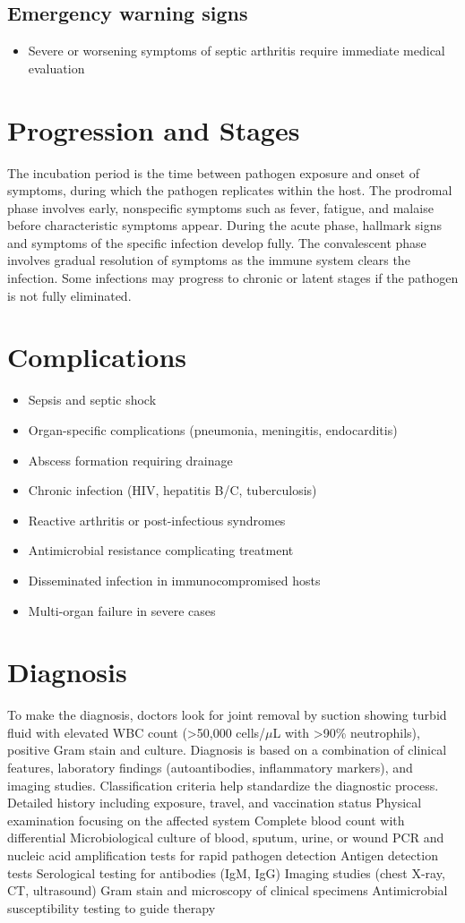 \subsection{Emergency warning signs}
\begin{itemize}[noitemsep]
  \item Severe or worsening symptoms of septic arthritis require immediate medical evaluation
\end{itemize}
\section{Progression and Stages}
The incubation period is the time between pathogen exposure and onset of symptoms, during which the pathogen replicates within the host. The prodromal phase involves early, nonspecific symptoms such as fever, fatigue, and malaise before characteristic symptoms appear. During the acute phase, hallmark signs and symptoms of the specific infection develop fully. The convalescent phase involves gradual resolution of symptoms as the immune system clears the infection. Some infections may progress to chronic or latent stages if the pathogen is not fully eliminated.
\section{Complications}
\begin{itemize}[noitemsep]
  \item Sepsis and septic shock
  \item Organ-specific complications (pneumonia, meningitis, endocarditis)
  \item Abscess formation requiring drainage
  \item Chronic infection (HIV, hepatitis B/C, tuberculosis)
  \item Reactive arthritis or post-infectious syndromes
  \item Antimicrobial resistance complicating treatment
  \item Disseminated infection in immunocompromised hosts
  \item Multi-organ failure in severe cases
\end{itemize}
\section{Diagnosis}
To make the diagnosis, doctors look for joint removal by suction showing turbid fluid with elevated WBC count (>50,000 cells/$\mu$L with >90\% neutrophils), positive Gram stain and culture. Diagnosis is based on a combination of clinical features, laboratory findings (autoantibodies, inflammatory markers), and imaging studies. Classification criteria help standardize the diagnostic process. Detailed history including exposure, travel, and vaccination status Physical examination focusing on the affected system Complete blood count with differential Microbiological culture of blood, sputum, urine, or wound PCR and nucleic acid amplification tests for rapid pathogen detection Antigen detection tests Serological testing for antibodies (IgM, IgG) Imaging studies (chest X-ray, CT, ultrasound) Gram stain and microscopy of clinical specimens Antimicrobial susceptibility testing to guide therapy

